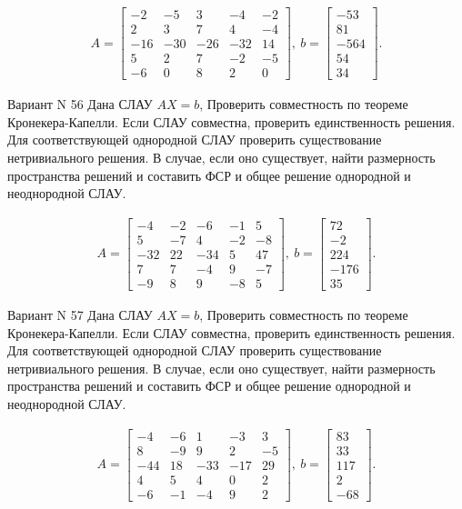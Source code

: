 \documentclass[11pt]{report}
\begin{document}
\begin{align*}
 A = \left[\begin{matrix}-2 & -5 & 3 & -4 & -2\\2 & 3 & 7 & 4 & -4\\-16 & -30 & -26 & -32 & 14\\5 & 2 & 7 & -2 & -5\\-6 & 0 & 8 & 2 & 0\end{matrix}\right],
\ b = \left[\begin{matrix}-53\\81\\-564\\54\\34\end{matrix}\right]. 
 \end{align*}

Вариант N 56
Дана СЛАУ $AX = b$,
Проверить совместность по теореме Кронекера-Капелли. Если СЛАУ совместна, проверить единственность решения.
Для соответствующей однородной СЛАУ проверить существование нетривиального решения. В случае, если оно существует,
найти размерность пространства решений и составить ФСР и общее решение однородной  и неоднородной СЛАУ.


\begin{align*}
 A = \left[\begin{matrix}-4 & -2 & -6 & -1 & 5\\5 & -7 & 4 & -2 & -8\\-32 & 22 & -34 & 5 & 47\\7 & 7 & -4 & 9 & -7\\-9 & 8 & 9 & -8 & 5\end{matrix}\right],
\ b = \left[\begin{matrix}72\\-2\\224\\-176\\35\end{matrix}\right]. 
 \end{align*}

Вариант N 57
Дана СЛАУ $AX = b$,
Проверить совместность по теореме Кронекера-Капелли. Если СЛАУ совместна, проверить единственность решения.
Для соответствующей однородной СЛАУ проверить существование нетривиального решения. В случае, если оно существует,
найти размерность пространства решений и составить ФСР и общее решение однородной  и неоднородной СЛАУ.


\begin{align*}
 A = \left[\begin{matrix}-4 & -6 & 1 & -3 & 3\\8 & -9 & 9 & 2 & -5\\-44 & 18 & -33 & -17 & 29\\4 & 5 & 4 & 0 & 2\\-6 & -1 & -4 & 9 & 2\end{matrix}\right],
\ b = \left[\begin{matrix}83\\33\\117\\2\\-68\end{matrix}\right]. 
 \end{align*}
\end{document}
